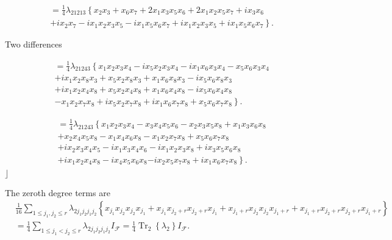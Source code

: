 \documentclass[aps, preprint]{revtex4}
\begin{document}
\begin{align*} &  =\frac{1}{4} \lambda _{2 1 2 1 3}\left \{x_{2} x_{3} +x_{6} x_{7} +2 x_{1} x_{3} x_{5} x_{6} +2 x_{1} x_{2} x_{5} x_{7} +i x_{3} x_{6}\right . \\
 &  +i x_{2} x_{7} -i x_{1} x_{2} x_{3} x_{5} -i x_{1} x_{5} x_{6} x_{7} +i x_{1} x_{2} x_{3} x_{5} +\left .i x_{1} x_{5} x_{6} x_{7}\right \} .\end{align*}

\bigskip Two differences 


\begin{align} &  =\frac{1}{4} \lambda _{2 1 2 4 3}\left \{x_{1} x_{2} x_{3} x_{4} -i x_{5} x_{2} x_{3} x_{4} -i x_{1} x_{6} x_{3} x_{4} -x_{5} x_{6} x_{3} x_{4}\right . \nonumber  \\
 &  +i x_{1} x_{2} x_{8} x_{3} +x_{5} x_{2} x_{8} x_{3} +x_{1} x_{6} x_{8} x_{3} -i x_{5} x_{6} x_{8} x_{3} \nonumber  \\
 &  +i x_{1} x_{2} x_{4} x_{8} +x_{5} x_{2} x_{4} x_{8} +x_{1} x_{6} x_{4} x_{8} -i x_{5} x_{6} x_{4} x_{8} \nonumber  \\
 & \left . -x_{1} x_{2} x_{7} x_{8} +i x_{5} x_{2} x_{7} x_{8} +i x_{1} x_{6} x_{7} x_{8} +x_{5} x_{6} x_{7} x_{8}\right \}\text{.}\end{align}


\begin{align} &  =\frac{1}{4} \lambda _{2 1 2 4 3}\left \{x_{1} x_{2} x_{3} x_{4} -x_{3} x_{4} x_{5} x_{6} -x_{2} x_{3} x_{5} x_{8} +x_{1} x_{3} x_{6} x_{8}\right . \nonumber  \\
 &  +x_{2} x_{4} x_{5} x_{8} -x_{1} x_{4} x_{6} x_{8} -x_{1} x_{2} x_{7} x_{8} +x_{5} x_{6} x_{7} x_{8} \nonumber  \\
 &  +i x_{2} x_{3} x_{4} x_{5} -i x_{1} x_{3} x_{4} x_{6} -i x_{1} x_{2} x_{3} x_{8} +i x_{3} x_{5} x_{6} x_{8} \\
 &  +i x_{1} x_{2} x_{4} x_{8} -i x_{4} x_{5} x_{6} x_{8}\left . -i x_{2} x_{5} x_{7} x_{8} +i x_{1} x_{6} x_{7} x_{8}\right \} . \nonumber \end{align}$\rfloor $ 

The zeroth degree terms are
\begin{align} & \frac{1}{16} \sum _{1 \leq j_{1} ,j_{2} \leq r}\lambda _{2 j_{1} j_{2} j_{1} j_{2}} \left \{x_{j_{1}} x_{j_{2}} x_{j_{2}} x_{j_{1}} +x_{j_{1}} x_{j_{2} +r} x_{j_{2} +r} x_{j_{1}} +x_{j_{1} +r} x_{j_{2}} x_{j_{2}} x_{j_{1} +r} +x_{j_{1} +r} x_{j_{2} +r} x_{j_{2} +r} x_{j_{1} +r}\right \} \nonumber  \\
 &  =\frac{1}{4} \sum _{1 \leq j_{1} <j_{2} \leq r}\lambda _{2 j_{1} j_{2} j_{1} j_{2}} I_{\mathcal{F}} =\frac{1}{4} \left .\ensuremath{\operatorname*{Tr}}\right ._{2} \left \{\lambda _{2}\right \} I_{\mathcal{F}}\text{.}\end{align}
\end{document}
